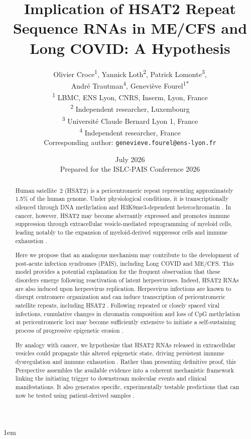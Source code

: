 \documentclass[11pt,a4paper]{scrartcl}
\title{Implication of HSAT2 Repeat Sequence RNAs in ME/CFS and Long COVID: A Hypothesis}
\author{Olivier Croce\textsuperscript{1}, Yannick Loth\textsuperscript{2},
        Patrick Lomonte\textsuperscript{3},\\[2pt]
        Andr{\'e} Trautman\textsuperscript{4},
        Genevi\`{e}ve Fourel\textsuperscript{1*}\\
       \small \textsuperscript{1} LBMC, ENS Lyon, CNRS, Inserm, Lyon, France\\
       \small \textsuperscript{2} Independent researcher, Luxembourg\\
       \small \textsuperscript{3} Universit\'e Claude Bernard Lyon 1, France\\
       \small \textsuperscript{4} Independent researcher, France\\[0.5em]
       \small *Corresponding author: \texttt{genevieve.fourel@ens-lyon.fr}}
\date{July 2026 \\ \vspace{0.5em} \small Prepared for the ISLC-PAIS Conference 2026}
\begin{document}
\emergencystretch 1em
\maketitle

\begin{abstract}
  Human satellite~2 (HSAT2) is a pericentromeric repeat representing
  approximately 1.5\% of the human genome.  Under physiological
  conditions, it is transcriptionally silenced through DNA methylation
  and H3K9me3-dependent heterochromatin \cite{Shadle2019HSATII,
  Gerard2023CTCFpreprint}.  In cancer, however, HSAT2 may become
  aberrantly expressed and promotes immune suppression through
  extracellular vesicle-mediated reprogramming of myeloid cells,
  leading notably to the expansion of myeloid-derived suppressor cells
  and immune exhaustion \cite{Ruzanov2024ETSsatelliteEV}.

  Here we propose that an analogous mechanism may contribute to the
  development of post-acute infection syndromes (PAIS), including
  Long COVID and ME/CFS.  This model provides a potential explanation
  for the frequent observation that these disorders emerge following
  reactivation of latent herpesviruses.  Indeed, HSAT2 RNAs are also
  induced upon herpesvirus replication.  Herpesvirus infections are
  known to disrupt centromere organization and can induce transcription
  of pericentromeric satellite repeats, including HSAT2
  \cite{Lahaye2025centromere,Nogalski2019HSATII,Vourc_h2022HSF1SatIII}.
  Following repeated or closely spaced viral infections, cumulative
  changes in chromatin composition and loss of CpG methylation at
  pericentromeric loci may become sufficiently extensive to initiate a
  self-sustaining process of progressive epigenetic erosion
  \cite{BonnetFourel2026ProAB,deVega2014methylation,
  Helliwell2020methylation,Peppercorn2025methylation,
  Shadle2019HSATII}.

  By analogy with cancer, we hypothesize that HSAT2 RNAs released in
  extracellular vesicles could propagate this altered epigenetic state,
  driving persistent immune dysregulation and immune exhaustion
  \cite{Ruzanov2024ETSsatelliteEV}.  Rather than presenting definitive
  proof, this Perspective assembles the available evidence into a
  coherent mechanistic framework linking the initiating trigger to
  downstream molecular events and clinical manifestations.  It also
  generates specific, experimentally testable predictions that can now
  be tested using patient-derived samples
  \cite{Seimiya2023HSATII,Yoruker2026HSAT2cfDNA}.
\end{abstract}
\end{document}
